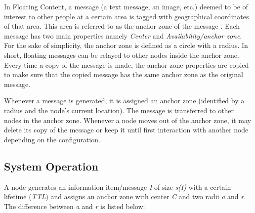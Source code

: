 In Floating Content, a message (a text message, an image, etc.) deemed to be of interest to other people at a certain area is tagged with geographical coordinates of that area. This area is referred to as the anchor zone of the message \cite{floating-content-1}. Each message has two main properties namely \textit{Center} and \textit{Availability/anchor zone}. For the sake of simplicity, the anchor zone is defined as a circle with a radius. In short, floating messages can be relayed to other nodes inside the anchor zone. Every time a copy of the message is made, the anchor zone properties are copied to make sure that the copied message has the same anchor zone as the original message.

Whenever a message is generated, it is assigned an anchor zone (identified by a radius and the node's current location). The message is transferred to other nodes in the anchor zone. Whenever a node moves out of the anchor zone, it may delete its copy of the message or keep it until first interaction with another node depending on the configuration.
\subsection {System Operation \cite{Ott2011FloatingCI}}
A node generates an information item/message \textit{I} of size \textit{s(I)} with a certain lifetime (\textit{TTL}) and assigns an anchor zone with center \textit{C} and two radii \textit{a} and \textit{r}. The difference between \textit{a} and \textit{r} is listed below:

